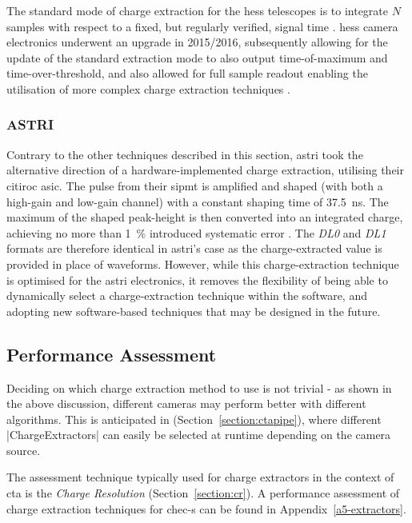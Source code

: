 The standard mode of charge extraction for the \gls{hess} telescopes is to integrate $N$ samples with respect to a fixed, but regularly verified, signal time \cite{Aharonian2004}. \gls{hess} camera electronics underwent an upgrade in 2015/2016, subsequently allowing for the update of the standard extraction mode to also output time-of-maximum and time-over-threshold, and also allowed for full sample readout enabling the utilisation of more complex charge extraction techniques \cite{Klepser2017}\cite{Chalme-Calvet2015}.

\subsubsection{ASTRI}

Contrary to the other techniques described in this section, \gls{astri} took the alternative direction of a hardware-implemented charge extraction, utilising their \gls{citiroc} \gls{asic}. The pulse from their \gls{sipmt} is amplified and shaped (with both a high-gain and low-gain channel) with a constant shaping time of \SI{37.5}{ns}. The maximum of the shaped peak-height is then converted into an integrated charge, achieving no more than \SI{1}{\percent} introduced systematic error \cite{Impiombato2017}. The \textit{DL0} and \textit{DL1} formats are therefore identical in \gls{astri}'s case as the charge-extracted value is provided in place of waveforms. However, while this charge-extraction technique is optimised for the \gls{astri} electronics, it removes the flexibility of being able to dynamically select a charge-extraction technique within the software, and adopting new software-based techniques that may be designed in the future.

\subsection{Performance Assessment}

Deciding on which charge extraction method to use is not trivial - as shown in the above discussion, different cameras may perform better with different algorithms. This is anticipated in  (Section~\ref{section:ctapipe}), where different |ChargeExtractors| can easily be selected at runtime depending on the camera source.

The assessment technique typically used for charge extractors in the context of \gls{cta} is the \textit{Charge Resolution} (Section~\ref{section:cr}). A performance assessment of charge extraction techniques for \gls{chec-s} can be found in Appendix~\ref{a5-extractors}.

